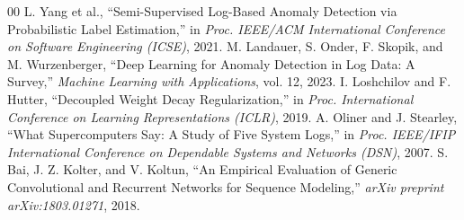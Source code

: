 \documentclass[conference]{IEEEtran}
\begin{document}
\begin{thebibliography}{00}
 L. Yang et al., ``Semi-Supervised Log-Based Anomaly Detection via Probabilistic Label Estimation,'' in \textit{Proc. IEEE/ACM International Conference on Software Engineering (ICSE)}, 2021.
 M. Landauer, S. Onder, F. Skopik, and M. Wurzenberger, ``Deep Learning for Anomaly Detection in Log Data: A Survey,'' \textit{Machine Learning with Applications}, vol. 12, 2023.
 I. Loshchilov and F. Hutter, ``Decoupled Weight Decay Regularization,'' in \textit{Proc. International Conference on Learning Representations (ICLR)}, 2019.
 A. Oliner and J. Stearley, ``What Supercomputers Say: A Study of Five System Logs,'' in \textit{Proc. IEEE/IFIP International Conference on Dependable Systems and Networks (DSN)}, 2007.
 S. Bai, J. Z. Kolter, and V. Koltun, ``An Empirical Evaluation of Generic Convolutional and Recurrent Networks for Sequence Modeling,'' \textit{arXiv preprint arXiv:1803.01271}, 2018.
\end{thebibliography}
\end{document}
